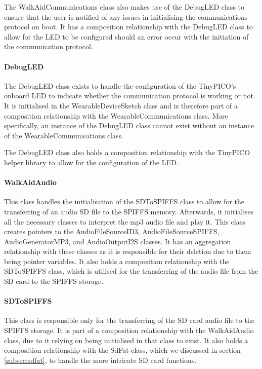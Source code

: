                     The WalkAidCommunications class also makes use of the DebugLED class to ensure that the user is notified of any issues in initialising the communications protocol on boot. It has a composition relationship with the DebugLED class to allow for the LED to be configured should an error occur with the initiation of the communication protocol.

                \paragraph{DebugLED}\mbox{}

                    The DebugLED class exists to handle the configuration of the TinyPICO's onboard LED to indicate whether the communication protocol is working or not. It is initialised in the WearableDeviceSketch class and is therefore part of a composition relationship with the WearableCommunications class. More specifically, an instance of the DebugLED class cannot exist without an instance of the WearableCommunications class.

                    The DebugLED class also holds a composition relationship with the TinyPICO helper library to allow for the configuration of the LED.

                \paragraph{WalkAidAudio}\mbox{}

                    This class handles the initialisation of the SDToSPIFFS class to allow for the transferring of an audio SD file to the SPIFFS memory. Afterwards, it initialises all the necessary classes to interpret the mp3 audio file and play it. This class creates pointers to the AudioFileSourceID3, AudioFileSourceSPIFFS, AudioGeneratorMP3, and AudioOutputI2S classes. It has an aggregation relationship with these classes as it is responsible for their deletion due to them being pointer variables. It also holds a composition relationship with the SDToSPIFFS class, which is utilised for the transferring of the audio file from the SD card to the SPIFFS storage. 

                \paragraph{SDToSPIFFS}\mbox{}

                    This class is responsible only for the transferring of the SD card audio file to the SPIFFS storage. It is part of a composition relationship with the WalkAidAudio class, due to it relying on being initialised in that class to exist. It also holds a composition relationship with the SdFat class, which we discussed in section \ref{subsec:sdfat}, to handle the more intricate SD card functions. 
                
